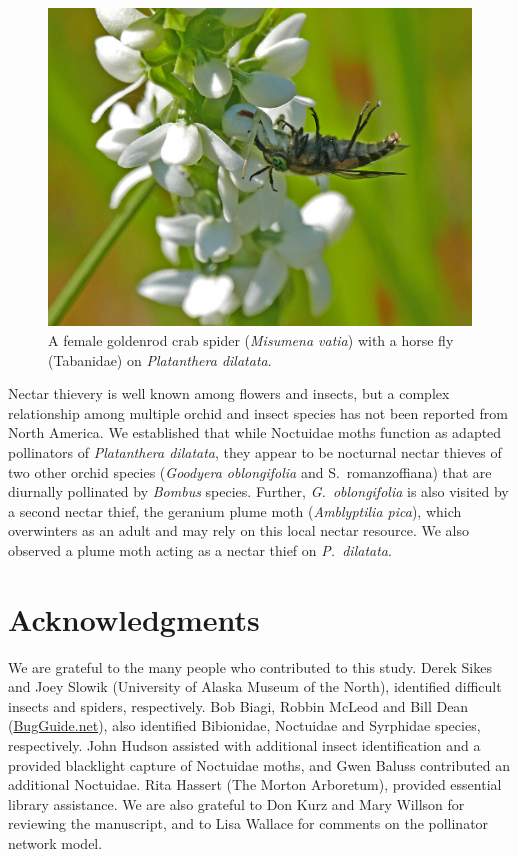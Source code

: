 \begin{multicols}{2}
\begin{figure}[H]
\begin{center}
\vspace{2mm}
\includegraphics[width=\textwidth]{img/Misumena_vatia_Tabanidae.jpg}
\caption{A female goldenrod crab spider (\emph{Misumena vatia}) with a horse fly (Tabanidae) on \emph{Platanthera dilatata}.}
\label{Misumena_vatia_Tabanidae}
\end{center}
\end{figure}

Nectar thievery is well known among flowers and insects, but a complex
relationship among multiple orchid and insect species has not been
reported from North America. We established that while Noctuidae moths
function as adapted pollinators of \emph{Platanthera dilatata}, they
appear to be nocturnal nectar thieves of two other orchid species
(\emph{Goodyera oblongifolia} and S.\ romanzoffiana) that are diurnally
pollinated by \emph{Bombus} species. Further, \emph{G.\ oblongifolia} is
also visited by a second nectar thief, the geranium plume moth
(\emph{Amblyptilia pica}), which overwinters as an adult and may rely on
this local nectar resource. We also observed a plume moth acting as a
nectar thief on \emph{P.\ dilatata}.

\section{Acknowledgments}

We are grateful to the many people who contributed to this study. Derek
Sikes and Joey Slowik (University of Alaska Museum of the North),
identified difficult insects and spiders, respectively. Bob Biagi,
Robbin McLeod and Bill Dean (\href{https://bugguide.net/}{BugGuide.net}), also identified Bibionidae,
Noctuidae and Syrphidae species, respectively. John Hudson assisted
with additional insect identification and a provided blacklight capture
of Noctuidae moths, and Gwen Baluss contributed an additional
Noctuidae. Rita Hassert (The Morton Arboretum), provided essential
library assistance. We are also grateful to Don Kurz and Mary Willson
for reviewing the manuscript, and to Lisa Wallace for comments on the
pollinator network model.


\end{multicols}

